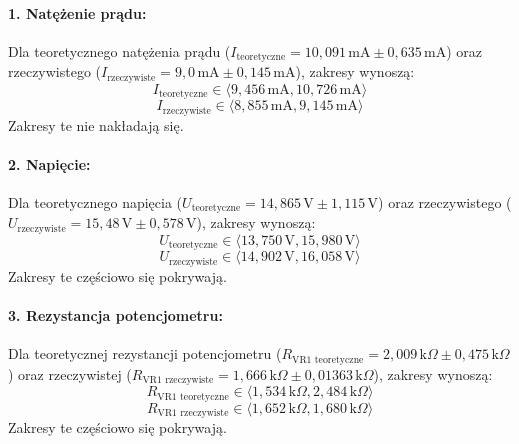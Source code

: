 \documentclass[,a4paper,12pt]{article}
\begin{document}
\paragraph{1. Natężenie prądu:}
Dla teoretycznego natężenia prądu (\(I_{\text{teoretyczne}} = 10,091 \, \text{mA} \pm 0,635 \, \text{mA}\)) oraz rzeczywistego (\(I_{\text{rzeczywiste}} = 9,0 \, \text{mA} \pm 0,145 \, \text{mA}\)), zakresy wynoszą:
\[
I_{\text{teoretyczne}} \in \langle 9,456 \, \text{mA}, 10,726 \, \text{mA} \rangle
\]
\[
I_{\text{rzeczywiste}} \in \langle 8,855 \, \text{mA}, 9,145 \, \text{mA} \rangle
\]
Zakresy te nie nakładają się.

\paragraph{2. Napięcie:}
Dla teoretycznego napięcia (\(U_{\text{teoretyczne}} = 14,865 \, \text{V} \pm 1,115 \, \text{V}\)) oraz rzeczywistego (\(U_{\text{rzeczywiste}} = 15,48 \, \text{V} \pm 0,578 \, \text{V}\)), zakresy wynoszą:
\[
U_{\text{teoretyczne}} \in \langle 13,750 \, \text{V}, 15,980 \, \text{V} \rangle
\]
\[
U_{\text{rzeczywiste}} \in \langle 14,902 \, \text{V}, 16,058 \, \text{V} \rangle
\]
Zakresy te częściowo się pokrywają.

\paragraph{3. Rezystancja potencjometru:}
Dla teoretycznej rezystancji potencjometru (\(R_{\text{VR1 teoretyczne}} = 2,009 \, \text{k}\Omega \pm 0,475 \, \text{k}\Omega\)) oraz rzeczywistej (\(R_{\text{VR1 rzeczywiste}} = 1,666 \, \text{k}\Omega \pm 0,01363 \, \text{k}\Omega\)), zakresy wynoszą:
\[
R_{\text{VR1 teoretyczne}} \in \langle 1,534 \, \text{k}\Omega, 2,484 \, \text{k}\Omega \rangle
\]
\[
R_{\text{VR1 rzeczywiste}} \in \langle 1,652 \, \text{k}\Omega, 1,680 \, \text{k}\Omega \rangle
\]
Zakresy te częściowo się pokrywają.
\end{document}
